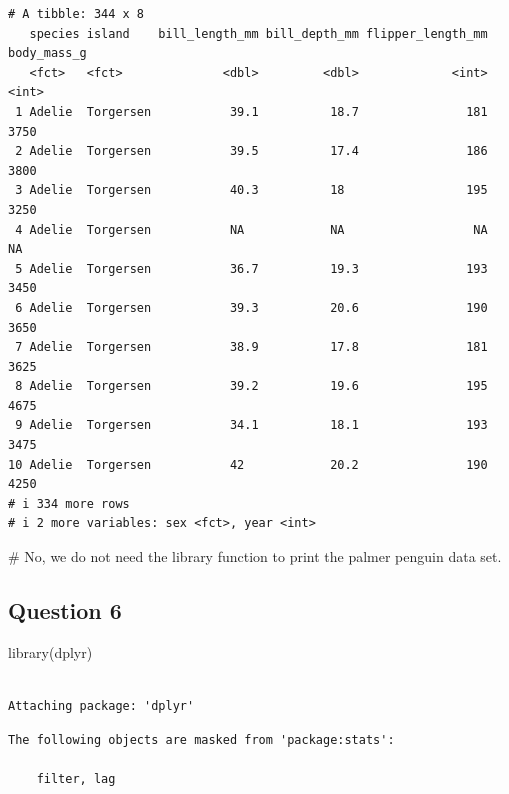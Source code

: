 \documentclass[
  letterpaper,
  DIV=11,
  numbers=noendperiod]{scrartcl}
\newenvironment{Shaded}{\begin{snugshade}}{\end{snugshade}}
\newcommand{\CommentTok}[1]{\textcolor[rgb]{0.37,0.37,0.37}{#1}}
\newcommand{\FunctionTok}[1]{\textcolor[rgb]{0.28,0.35,0.67}{#1}}
\newcommand{\NormalTok}[1]{\textcolor[rgb]{0.00,0.23,0.31}{#1}}
\begin{document}
\begin{verbatim}
# A tibble: 344 x 8
   species island    bill_length_mm bill_depth_mm flipper_length_mm body_mass_g
   <fct>   <fct>              <dbl>         <dbl>             <int>       <int>
 1 Adelie  Torgersen           39.1          18.7               181        3750
 2 Adelie  Torgersen           39.5          17.4               186        3800
 3 Adelie  Torgersen           40.3          18                 195        3250
 4 Adelie  Torgersen           NA            NA                  NA          NA
 5 Adelie  Torgersen           36.7          19.3               193        3450
 6 Adelie  Torgersen           39.3          20.6               190        3650
 7 Adelie  Torgersen           38.9          17.8               181        3625
 8 Adelie  Torgersen           39.2          19.6               195        4675
 9 Adelie  Torgersen           34.1          18.1               193        3475
10 Adelie  Torgersen           42            20.2               190        4250
# i 334 more rows
# i 2 more variables: sex <fct>, year <int>
\end{verbatim}

\begin{Shaded}
\begin{Highlighting}[]
\CommentTok{\# No, we do not need the library function to print the palmer penguin data set.}
\end{Highlighting}
\end{Shaded}

\subsection{Question 6}\label{question-6}

\begin{Shaded}
\begin{Highlighting}[]
\FunctionTok{library}\NormalTok{(dplyr)}
\end{Highlighting}
\end{Shaded}

\begin{verbatim}

Attaching package: 'dplyr'
\end{verbatim}

\begin{verbatim}
The following objects are masked from 'package:stats':

    filter, lag
\end{verbatim}
\end{document}
